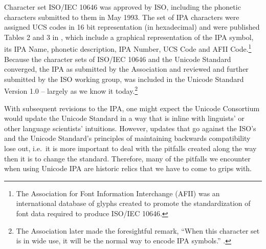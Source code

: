 Character set ISO/IEC 10646 was approved by ISO, including the phonetic 
characters submitted to them in May 1993. The set of IPA characters were 
assigned UCS codes in 16 bit representation (in hexadecimal) and were 
published Tables 2 and 3 in \cite{EslingGaylord1993}, which include a 
graphical representation of the IPA symbol, its IPA Name, phonetic description, 
IPA Number, UCS Code and AFII Code.\footnote{The Association for Font 
Information Interchange (AFII) was an international database of glyphs 
created to promote the standardization of font data required to produce 
ISO/IEC 10646.} Because the character sets of ISO/IEC 10646 and the 
Unicode Standard converged, the IPA as submitted by the Association 
and reviewed and further submitted by the ISO working group, was included 
in the Unicode Standard Version 1.0 -- largely as we know it today.\footnote{The 
Association later made the foresightful remark, ``When this character set 
is in wide use, it will be the normal way to encode IPA symbols.'' \citep[164]{IPA1999}.}

With subsequent revisions to the IPA, one might expect the Unicode 
Consortium would update the Unicode Standard in a way that is inline 
with linguists' or other language scientists' intuitions. However, 
updates that go against the ISO's and the Unicode Standard's principles 
of maintaining backwards compatibility lose out, i.e.\ it is more important 
to deal with the pitfalls created along the way then it is to change the 
standard. Therefore, many of the pitfalls we encounter when using Unicode 
IPA are historic relics that we have to come to grips with.

